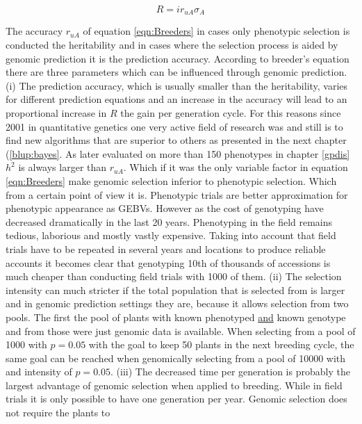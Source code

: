 \begin{equation}
  R = i r_{uA} \sigma_A
\label{eqn:Breeders}
\end{equation}

The accuracy $r_{uA}$ of equation \ref{eqn:Breeders} in cases only phenotypic selection is conducted the
heritability and in cases where the selection process is aided by genomic prediction it is the prediction
accuracy.  According to breeder's equation there are three parameters which can be influenced through genomic
prediction. \newline (i) The prediction accuracy, which is usually smaller than the heritability, varies for
different prediction equations and an increase in the accuracy will lead to an proportional increase in $R$
the gain per generation cycle. For this reasons since 2001 in quantitative genetics one very active field of
research was and still is to find new algorithms that are superior to others as presented in the next chapter
(\ref{blup:bayes}.  As later evaluated on more than 150 phenotypes in chapter \ref{gpdis} $h^2$ is always
larger than $r_{uA}$.  Which if it was the only variable factor in equation \ref{eqn:Breeders} make genomic
selection inferior to phenotypic selection. Which from a certain point of view it is. Phenotypic trials are
better approximation for phenotypic appearance as GEBVs. However as the cost of genotyping have decreased
dramatically in the last 20 years. Phenotyping in the field remains tedious, laborious and mostly vastly
expensive. Taking into account that field trials have to be repeated in several years and locations to produce
reliable accounts it becomes clear that genotyping 10th of thousands of accessions is much cheaper than
conducting field trials with 1000 of them. \newline (ii) The selection intensity can much stricter if the
total population that is selected from is larger and in genomic prediction settings they are, because it
allows selection from two pools. The first the pool of plants with known phenotyped \underline{and} known
genotype and from those were just genomic data is available. When selecting from a pool of 1000 with $p=0.05$
with the goal to keep 50 plants in the next breeding cycle, the same goal can be reached when genomically
selecting from a pool of 10000 with and intensity of $p=0.05$. \newline (iii) The decreased time per
generation is probably the largest advantage of genomic selection when applied to breeding. While in field
trials it is only possible to have one generation per year. Genomic selection does not require the plants to
